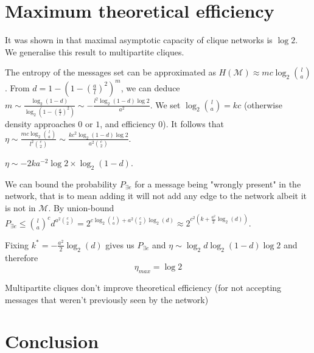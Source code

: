 \documentclass[english,11pt,twocolumn]{article}
\renewcommand{\le}{\leqslant}
\theoremstyle{definition}
\begin{document}
	\section{Maximum theoretical efficiency}
		It was shown in \cite{oo} that maximal asymptotic capacity of clique networks is $\log 2$. We generalise this result to multipartite cliques.
		
		The entropy of the messages set can be approximated as $H(\mathcal{M}) \approx m c \log_2 {l \choose a}$. From $d = 1 - \left (1- \left(\frac{a}{l}\right)^2 \right)^m$, we can deduce $m \sim \frac{\log_2(1-d)}{\log_2(1-(\frac{a}{l})^2)} \sim - \frac{l^2 \log_2(1-d) \log 2}{a^2}$.
		We set $\log_2 {l \choose a} = k c$ (otherwise density approaches $0$ or $1$, and efficiency $0$). It follows that $\eta \sim \frac{m c \log_2 {l \choose a}}{l^2 {c \choose 2}} \sim \frac{k c^2 \log_2(1-d)\log 2}{a^2 {c \choose 2}}$. 
		
		$\eta \sim - 2 k  a^{-2}\log 2 \times \log_2 (1-d)$.
		
		We can bound the probability $P_{\exists e}$ for a message being "wrongly present" in the network, that is to mean adding it will not add any edge to the network albeit it is not in $\mathcal{M}$. By union-bound $P_{\exists e} \le {l \choose a}^c d^{a^2 {c \choose 2}} = 2^{c \log_ 2 {l \choose a} + a^2 {c \choose 2 }\log_2(d)} \approx 2^{c^2(k + \frac{a^2}{2} \log_2 (d))}$.
		
		Fixing $k^* = -\frac{a^2}{2} \log_2 (d)$ gives us $P_{\exists e}$ and $\eta \sim \log_2 d \log_2 (1-d) \log 2$ and therefore \[\eta_{max} = \log 2\]
	
		Multipartite cliques don't improve theoretical efficiency (for not accepting messages that weren't previously seen by the network)

	
	\section{Conclusion}	
	
	
	
	
	
	
	\nocite{*}
     {}
\end{document}
